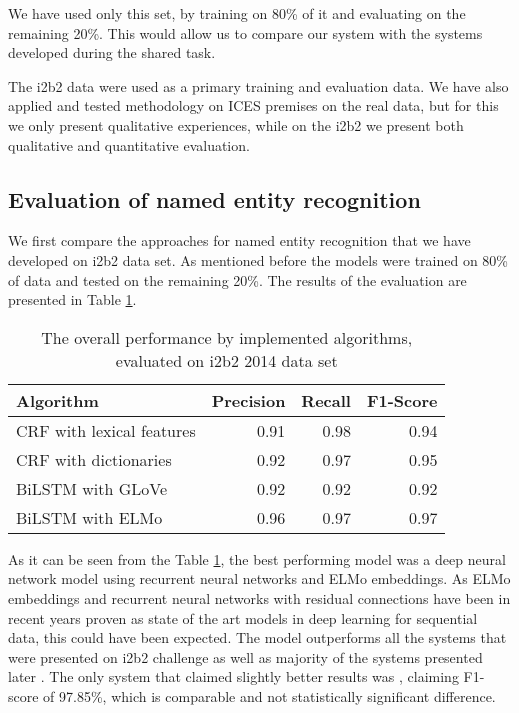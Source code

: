 \documentclass[a4paper,twoside]{article}
\begin{document}
We have used only this set, by training on 80\% of it and evaluating on the remaining 20\%. This would allow us to compare our system with the systems developed during the shared task. 

The i2b2 data were used as a primary training and evaluation data. We have also applied and tested methodology on ICES premises on the real data, but for this we only present qualitative experiences, while on the i2b2 we present both qualitative and quantitative evaluation. 

\subsection{Evaluation of named entity recognition}

We first compare the approaches for named entity recognition that we have developed on i2b2 data set. As mentioned before the models were trained on 80\% of data and tested on the remaining 20\%. The results of the evaluation are presented in Table \ref{table:perfModels}. 

\begin{table}[htbp]
\centering
\begin{tabular}{ lrrr }
  \hline
   \small{\textbf{Algorithm}} & \small{\textbf{Precision}} & \small{\textbf{Recall}} & \small{\textbf{F1-Score}}\\ \hline
  \small{CRF with lexical features} & \small{0.91} & \small{0.98} & \small{0.94} \\
   \small{CRF with dictionaries} & \small{0.92} & \small{0.97} & \small{0.95} \\
   \small{BiLSTM with GLoVe} & \small{0.92} & \small{0.92} & \small{0.92} \\
 \small{BiLSTM with ELMo} & \small{0.96} & \small{0.97} & \small{0.97} \\
\hline
\end{tabular} 
\caption{The overall performance by implemented algorithms, evaluated on i2b2 2014 data set}
\label{table:perfModels}
\end{table}

As it can be seen from the Table \ref{table:perfModels}, the best performing model was a deep neural network model using recurrent neural networks and ELMo embeddings. As ELMo embeddings and recurrent neural networks with residual connections have been in recent years proven as state of the art models in deep learning for sequential data, this could have been expected. The model outperforms all the systems that were presented on i2b2 challenge \cite{stubbs2015automated} as well as majority of the systems presented later \cite{kim2018ensemble,li2019efficient}. The only system that claimed slightly better results was \cite{dernoncourt2017identification}, claiming F1-score of 97.85\%, which is comparable and not statistically significant difference.
\end{document}
